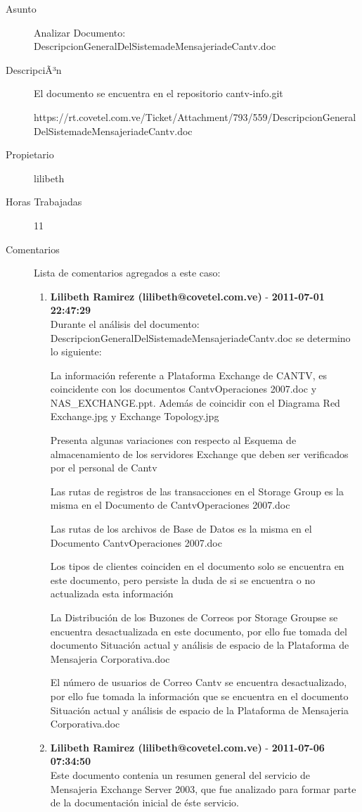 \begin{description}

\item[Asunto] Analizar Documento: DescripcionGeneralDelSistemadeMensajeriadeCantv.doc\item[DescripciÃ³n] El documento se encuentra en el repositorio cantv-info.git

https://rt.covetel.com.ve/Ticket/Attachment/793/559/DescripcionGeneralDelSistemadeMensajeriadeCantv.doc\item[Propietario] lilibeth\item[Horas Trabajadas] 11

\item[Comentarios] Lista de comentarios agregados a este caso:  
\begin{enumerate}
        \item {\bfseries Lilibeth Ramirez (lilibeth@covetel.com.ve)  } - {\bfseries 2011-07-01 22:47:29} \\ Durante el análisis del documento:
DescripcionGeneralDelSistemadeMensajeriadeCantv.doc se determino lo siguiente:

La información referente a Plataforma Exchange de CANTV, es coincidente con los
documentos CantvOperaciones 2007.doc y NAS_EXCHANGE.ppt. Además de coincidir
con el Diagrama Red Exchange.jpg y Exchange Topology.jpg

Presenta algunas variaciones con respecto al Esquema de almacenamiento de los
servidores Exchange que deben ser verificados por el personal de Cantv

Las rutas de registros de las transacciones en el Storage Group es la misma en
el Documento de CantvOperaciones 2007.doc

Las rutas de los archivos de Base de Datos es la misma en el Documento
CantvOperaciones 2007.doc

Los tipos de clientes coinciden en el documento solo se encuentra en este
documento, pero persiste la duda de si se encuentra o no actualizada esta
información

La Distribución de los Buzones de Correos por Storage Groupse se encuentra
desactualizada en este documento, por ello fue tomada del documento Situación
actual y análisis de espacio de la Plataforma de Mensajeria Corporativa.doc

El número de usuarios de Correo Cantv se encuentra desactualizado, por ello fue
tomada la información que se encuentra en el documento Situación actual y
análisis de espacio de la Plataforma de Mensajeria Corporativa.doc        \item {\bfseries Lilibeth Ramirez (lilibeth@covetel.com.ve)  } - {\bfseries 2011-07-06 07:34:50} \\ Este documento contenia un resumen general del servicio de Mensajeria Exchange
Server 2003, que fue analizado para formar parte de la documentación inicial de
éste servicio.    \end{enumerate}

\end{description}

